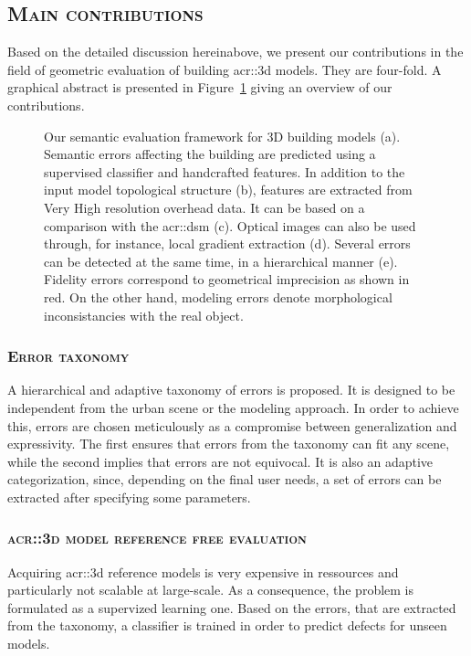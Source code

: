     \subsection{\textsc{Main contributions}}
        \label{sec::introduction::contributions::contributions}
        Based on the detailed discussion hereinabove, we present our contributions in the field of geometric evaluation of building \gls{acr::3d} models.
        They are four-fold.
        A graphical abstract is presented in Figure~\ref{fig::graphical_abstract} giving an overview of our contributions.
        \begin{figure}[htpb]
            \centering
                        
            \caption{
                \label{fig::graphical_abstract} Our semantic evaluation framework for 3D building models (a).
                Semantic errors affecting the building are predicted using a supervised classifier and handcrafted features.
                In addition to the input model topological structure (b), features are extracted from Very High resolution overhead data.
                It can be based on a comparison with the \gls*{acr::dsm} (c).
                Optical images can also be used through, for instance, local gradient extraction (d).
                Several errors can be detected at the same time, in a hierarchical manner (e).
                Fidelity errors correspond to geometrical imprecision as shown in red.
                On the other hand, modeling errors denote morphological inconsistancies with the real object.
            }
        \end{figure}
        \subsubsection{\textsc{Error taxonomy}}
            A hierarchical and adaptive taxonomy of errors is proposed.
            It is designed to be independent from the urban scene or the modeling approach.
            In order to achieve this, errors are chosen meticulously as a compromise between generalization and expressivity.
            The first ensures that errors from the taxonomy can fit any scene, while the second implies that errors are not equivocal.
            It is also an adaptive categorization, since, depending on the final user needs, a set of errors can be extracted after specifying some parameters.
            
        \subsubsection{\textsc{\texorpdfstring{\gls*{acr::3d}}{3D} model reference free evaluation}}
            Acquiring \gls{acr::3d} reference models is very expensive in ressources and particularly not scalable at large-scale.
            As a consequence, the problem is formulated as a supervized learning one.
            Based on the errors, that are extracted from the taxonomy, a classifier is trained in order to predict defects for unseen models.


